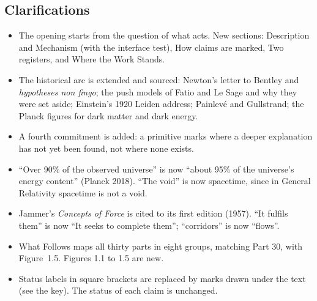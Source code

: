 \subsection*{Clarifications}
\begin{itemize}
  \item The opening starts from the question of what acts. New sections: Description and Mechanism (with the interface test), How claims are marked, Two registers, and Where the Work Stands.
  \item The historical arc is extended and sourced: Newton's letter to Bentley and \emph{hypotheses non fingo}; the push models of Fatio and Le Sage and why they were set aside; Einstein's 1920 Leiden address; Painlevé and Gullstrand; the Planck figures for dark matter and dark energy.
  \item A fourth commitment is added: a primitive marks where a deeper explanation has not yet been found, not where none exists.
  \item ``Over 90\% of the observed universe'' is now ``about 95\% of the universe's energy content'' (Planck 2018). ``The void'' is now spacetime, since in General Relativity spacetime is not a void.
  \item Jammer's \emph{Concepts of Force} is cited to its first edition (1957). ``It fulfils them'' is now ``It seeks to complete them''; ``corridors'' is now ``flows''.
  \item What Follows maps all thirty parts in eight groups, matching Part 30, with Figure~1.5. Figures 1.1 to 1.5 are new.
  \item Status labels in square brackets are replaced by marks drawn under the text (see the key). The status of each claim is unchanged.
\end{itemize}



